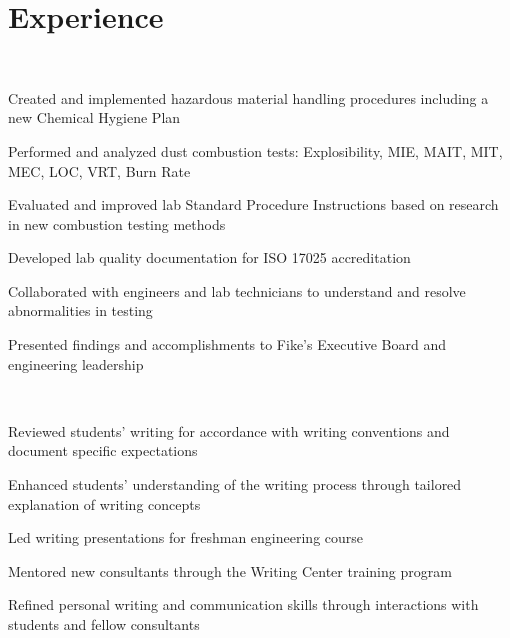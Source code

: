 \documentclass[]{deedy-resume-openfont}
\begin{document}
\begin{minipage}[t]{0.66\textwidth} 

\sectionsep
\section{Experience}
\sectionsep
{} 
\sectionsep \\
\vspace{\topsep} %
\begin{tightemize}
	\item Created and implemented hazardous material handling procedures including a new Chemical Hygiene Plan
	\item Performed and analyzed dust combustion tests: Explosibility, MIE, MAIT, MIT, MEC, LOC, VRT, Burn Rate
	\item Evaluated and improved lab Standard Procedure Instructions based on research in new combustion testing methods 
	\item Developed lab quality documentation for ISO 17025 accreditation
	\item Collaborated with engineers and lab technicians to understand and resolve abnormalities in testing
	\item Presented findings and accomplishments to Fike's Executive Board and engineering leadership 
\end{tightemize}
\sectionsep
\sectionsep
\sectionsep
{} 
\sectionsep\\
\begin{tightemize}
	\item Reviewed students' writing for accordance with writing conventions and document specific expectations
	\item Enhanced students' understanding of the writing process through tailored explanation of writing concepts
	\item Led writing presentations for freshman engineering course
	\item Mentored new consultants through the Writing Center training program
	\item Refined personal writing and communication skills through interactions with students and fellow consultants

\end{tightemize}
\end{minipage}
\end{document}
